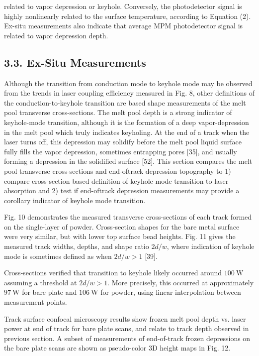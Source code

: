 \documentclass[10pt]{article}
\begin{document}
related to vapor depression or keyhole. Conversely, the photodetector signal is highly nonlinearly related to the surface temperature, according to Equation (2). Ex-situ measurements also indicate that average MPM photodetector signal is related to vapor depression depth.

\subsection*{3.3. Ex-Situ Measurements}
Although the transition from conduction mode to keyhole mode may be observed from the trends in laser coupling efficiency measured in Fig. 8, other definitions of the conduction-to-keyhole transition are based shape measurements of the melt pool transverse cross-sections. The melt pool depth is a strong indicator of keyhole-mode transition, although it is the formation of a deep vapor-depression in the melt pool which truly indicates keyholing. At the end of a track when the laser turns off, this depression may solidify before the melt pool liquid surface fully fills the vapor depression, sometimes entrapping pores [35], and usually forming a depression in the solidified surface [52]. This section compares the melt pool transverse cross-sections and end-oftrack depression topography to 1) compare cross-section based definition of keyhole mode transition to laser absorption and 2) test if end-oftrack depression measurements may provide a corollary indicator of keyhole mode transition.

Fig. 10 demonstrates the measured transverse cross-sections of each track formed on the single-layer of powder. Cross-section shapes for the bare metal surface were very similar, but with lower top surface bead heights. Fig. 11 gives the measured track widths, depths, and shape ratio $2 d / w$, where indication of keyhole mode is sometimes defined as when $2 d / w>1$ [39].

Cross-sections verified that transition to keyhole likely occurred around $100 \mathrm{~W}$ assuming a threshold at $2 d / w>1$. More precisely, this occurred at approximately $97 \mathrm{~W}$ for bare plate and $106 \mathrm{~W}$ for powder, using linear interpolation between measurement points.

Track surface confocal microscopy results show frozen melt pool depth vs. laser power at end of track for bare plate scans, and relate to track depth observed in previous section. A subset of measurements of end-of-track frozen depressions on the bare plate scans are shown as pseudo-color 3D height maps in Fig. 12.
\end{document}

